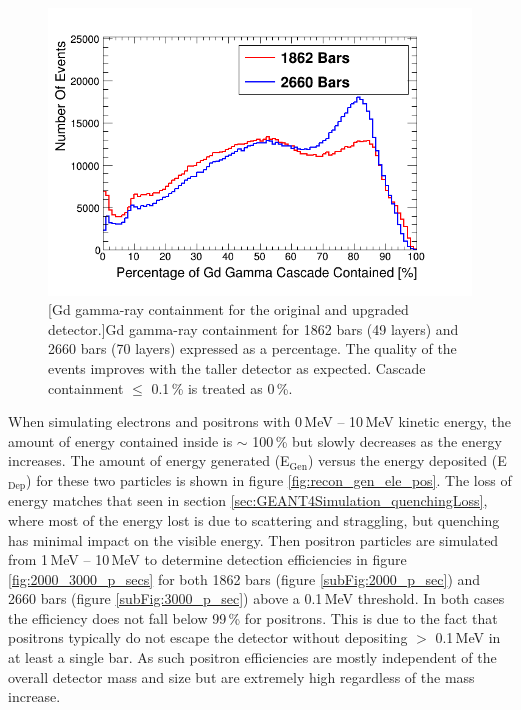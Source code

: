 \begin{figure}[!h]
 \centering
 \includegraphics[width=0.7\linewidth]{Chapter4/Figs/cascadeContainmentCompare.png}
 [Gd gamma-ray containment for the original and upgraded detector.]{Gd gamma-ray containment for 1862 bars (49 layers) and 2660 bars (70 layers) expressed as a percentage. The quality of the events improves with the taller detector as expected. Cascade containment $\leq$ 0.1\,\% is treated as 0\,\%. }
 \label{fig:containment_comparison}
\end{figure} 

When simulating electrons and positrons with 0\,MeV -- 10\,MeV kinetic energy, the amount of energy contained inside is $\sim$ 100\,\% but slowly decreases as the energy increases. The amount of energy generated (E$_\textrm{{Gen}}$) versus the energy deposited  (E$_\textrm{{Dep}}$) for these two particles is shown in figure \ref{fig:recon_gen_ele_pos}. The loss of energy matches that seen in section \ref{sec:GEANT4Simulation_quenchingLoss}, where most of the energy lost is due to scattering and straggling, but quenching has minimal impact on the visible energy. Then positron particles are simulated from 1\,MeV -- 10\,MeV to determine detection efficiencies in figure \ref{fig:2000_3000_p_secs} for both 1862 bars (figure \ref{subFig:2000_p_sec}) and 2660 bars (figure \ref{subFig:3000_p_sec}) above a 0.1\,MeV threshold. In both cases the efficiency does not fall below 99\,\% for positrons. This is due to the fact that positrons typically do not escape the detector without depositing $>$ 0.1\,MeV in at least a single bar. As such positron efficiencies are mostly independent of the overall detector mass and size but are extremely high regardless of the mass increase.  

